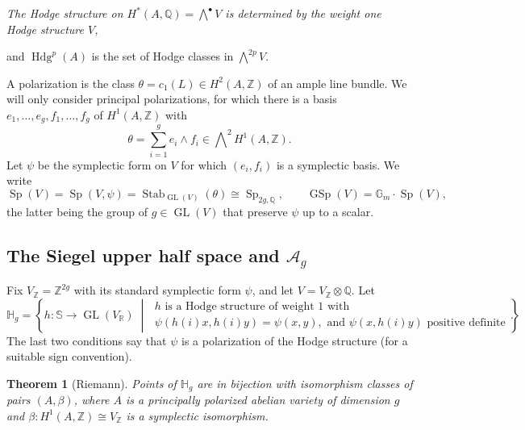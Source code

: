 \documentclass[12pt]{amsart}
\newcommand{\R}{\mathbb{R}}
\newcommand{\Q}{\mathbb{Q}}
\newcommand{\Z}{\mathbb{Z}}
\newcommand{\Gm}{\mathbb{G}_m}
\newcommand{\Del}{\mathbb{S}}
\DeclareMathOperator{\GL}{GL}
\DeclareMathOperator{\Sp}{Sp}
\DeclareMathOperator{\GSp}{GSp}
\DeclareMathOperator{\Hdg}{Hdg}
\DeclareMathOperator{\Stab}{Stab}
\newcommand{\cA}{\mathcal{A}}
\newcommand{\HH}{\mathbb{H}}
\let\oldbigwedge\bigwedge
\renewcommand{\bigwedge}{\mathop{\textstyle\oldbigwedge}\nolimits}
\newtheorem{theorem}{Theorem}[section]
\theoremstyle{definition}
\theoremstyle{remark}
\numberwithin{equation}{section}
\begin{document}
\begin{center}
    \emph{The Hodge structure on $H^*(A, \Q) = \bigwedge^\bullet V$ is determined
    by the weight one Hodge structure $V$,}
\end{center}
and $\Hdg^p(A)$ is the set of Hodge classes in $\bigwedge^{2p} V$.

A polarization is the class $\theta = c_1(L) \in H^2(A, \Z)$ of an ample line
bundle. We will only consider principal polarizations, for which there is a
basis $e_1, \ldots, e_g, f_1, \ldots, f_g$ of $H^1(A, \Z)$ with
\begin{equation*}
    \theta = \sum_{i=1}^g e_i \wedge f_i \in \bigwedge^2 H^1(A, \Z).
\end{equation*}
Let $\psi$ be the symplectic form on $V$ for which $(e_i, f_i)$ is a symplectic
basis. We write
\begin{equation*}
    \Sp(V) = \Sp(V, \psi) = \Stab_{\GL(V)}(\theta) \cong \Sp_{2g, \Q}, \qquad
    \GSp(V) = \Gm \cdot \Sp(V),
\end{equation*}
the latter being the group of $g \in \GL(V)$ that preserve $\psi$ up to a
scalar.

\subsection{The Siegel upper half space and \texorpdfstring{$\cA_g$}{A\_g}}
Fix $V_\Z = \Z^{2g}$ with its standard symplectic form $\psi$, and let
$V = V_\Z \otimes \Q$. Let
\begin{equation*}
    \HH_g = \left\{ h \colon \Del \to \GL(V_\R) \;\middle|\;
    \begin{array}{l}
        h \text{ is a Hodge structure of weight } 1 \text{ with}\\
        \psi(h(i) x, h(i) y) = \psi(x, y), \text{ and } \psi(x, h(i)y)
        \text{ positive definite}
    \end{array}\right\}.
\end{equation*}
The last two conditions say that $\psi$ is a polarization of the Hodge
structure (for a suitable sign convention).

\begin{theorem}[Riemann]
    Points of $\HH_g$ are in bijection with isomorphism classes of pairs
    $(A, \beta)$, where $A$ is a principally polarized abelian variety of
    dimension $g$ and $\beta \colon H^1(A, \Z) \cong V_\Z$ is a symplectic
    isomorphism.
\end{theorem}
\end{document}
